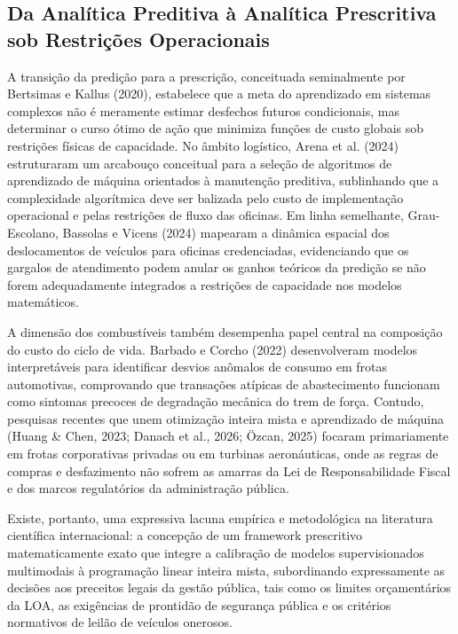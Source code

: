 \documentclass[12pt,a4paper]{article}
\begin{document}
\subsection{Da Analítica Preditiva à Analítica Prescritiva sob Restrições Operacionais}

A transição da predição para a prescrição, conceituada seminalmente por Bertsimas e Kallus (2020), estabelece que a meta do aprendizado em sistemas complexos não é meramente estimar desfechos futuros condicionais, mas determinar o curso ótimo de ação que minimiza funções de custo globais sob restrições físicas de capacidade. No âmbito logístico, Arena et al. (2024) estruturaram um arcabouço conceitual para a seleção de algoritmos de aprendizado de máquina orientados à manutenção preditiva, sublinhando que a complexidade algorítmica deve ser balizada pelo custo de implementação operacional e pelas restrições de fluxo das oficinas. Em linha semelhante, Grau-Escolano, Bassolas e Vicens (2024) mapearam a dinâmica espacial dos deslocamentos de veículos para oficinas credenciadas, evidenciando que os gargalos de atendimento podem anular os ganhos teóricos da predição se não forem adequadamente integrados a restrições de capacidade nos modelos matemáticos.

A dimensão dos combustíveis também desempenha papel central na composição do custo do ciclo de vida. Barbado e Corcho (2022) desenvolveram modelos interpretáveis para identificar desvios anômalos de consumo em frotas automotivas, comprovando que transações atípicas de abastecimento funcionam como sintomas precoces de degradação mecânica do trem de força. Contudo, pesquisas recentes que unem otimização inteira mista e aprendizado de máquina (Huang \& Chen, 2023; Danach et al., 2026; Özcan, 2025) focaram primariamente em frotas corporativas privadas ou em turbinas aeronáuticas, onde as regras de compras e desfazimento não sofrem as amarras da Lei de Responsabilidade Fiscal e dos marcos regulatórios da administração pública.

Existe, portanto, uma expressiva lacuna empírica e metodológica na literatura científica internacional: a concepção de um framework prescritivo matematicamente exato que integre a calibração de modelos supervisionados multimodais à programação linear inteira mista, subordinando expressamente as decisões aos preceitos legais da gestão pública, tais como os limites orçamentários da LOA, as exigências de prontidão de segurança pública e os critérios normativos de leilão de veículos onerosos.
\end{document}
